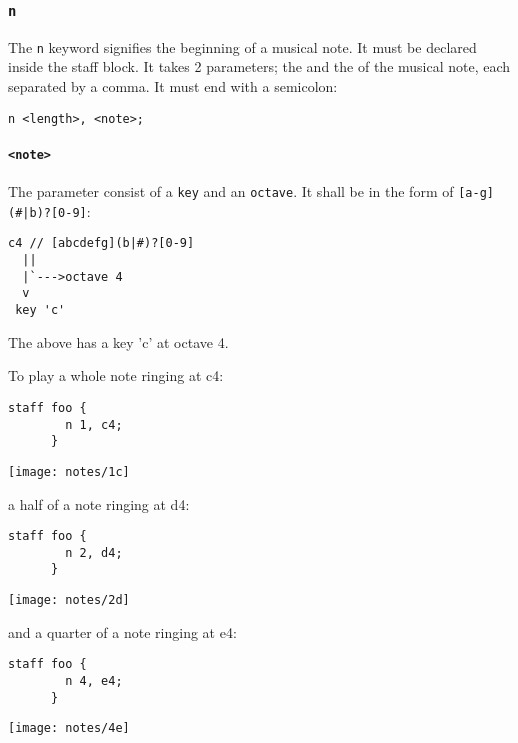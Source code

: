 \subsubsection{\texttt{n}}

\np The \verb+n+ keyword signifies the beginning of a musical note. It must be declared
inside the staff block.
It takes 2 parameters; the  and the  of the
musical note, each separated by a comma. It must end with a semicolon: 

\begin{Verbatim}[frame=single]
      n <length>, <note>;
\end{Verbatim}

\paragraph{\texttt{<note>}} The parameter  consist of a \verb+key+ and an \verb+octave+. It shall be in the form of \verb+[a-g](#|b)?[0-9]+:

\begin{Verbatim}[frame=single]
  c4 // [abcdefg](b|#)?[0-9]
  ||
  |`--->octave 4
  v
 key 'c'
\end{Verbatim}
The above has a key 'c' at octave 4.

\np To play a whole note ringing at c4:
\begin{Verbatim}[frame=single]
      staff foo {
        n 1, c4;
      }
\end{Verbatim}

\begin{center}
\texttt{[image: notes/1c]}
\end{center}

a half of a note ringing at d4:

\begin{Verbatim}[frame=single]
      staff foo {
        n 2, d4;
      }
\end{Verbatim}

\begin{center}
\texttt{[image: notes/2d]}
\end{center}

and a quarter of a note ringing at e4:
\begin{Verbatim}[frame=single]
      staff foo {
        n 4, e4;
      }
\end{Verbatim}

\begin{center}
\texttt{[image: notes/4e]}
\end{center}

